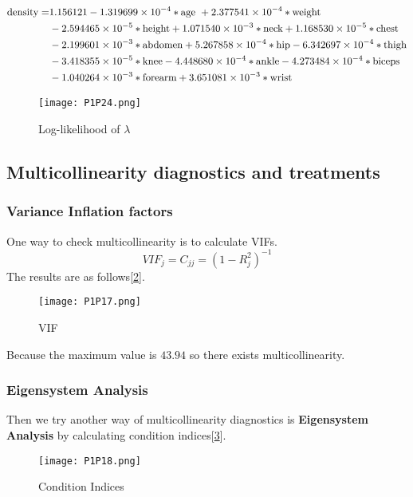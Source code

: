 \documentclass[11pt]{article}
\begin{document}
\begin{align}
	\text{density} = &1.156121-1.319699\times10^{-4} *\text{age }+2.377541\times10^{-4}*\text{weight}\notag\\
	&-2.594465\times10^{-5}*\text{height}+1.071540\times10^{-3}*\text{neck} +1.168530\times10^{-5}*\text{chest}\notag\\
	&-2.199601\times10^{-3}*\text{abdomen}+5.267858\times10^{-4}*\text{hip}-6.342697\times10^{-4}*\text{thigh}\notag \\ 
    &-3.418355\times10^{-5}*\text{knee} -4.448680\times10^{-4}*\text{ankle}-4.273484\times10^{-4}*\text{biceps}\notag\\
    & -1.040264\times10^{-3}*\text{forearm}+3.651081\times10^{-3}*\text{wrist}\label{eq2}    
\end{align}

\begin{figure}[!htb]
\centering
\texttt{[image: P1P24.png]}
\caption{Log-likelihood of $\lambda$}\label{Fig21}
\end{figure}


\subsection{Multicollinearity diagnostics and treatments}\label{ch5}

\subsubsection{Variance Inflation factors}


One way to check multicollinearity is to calculate VIFs.$$VIF_j=C_{jj}=(1-R_j^2)^{-1}$$The results are as follows[\ref{Fig14}].

\begin{figure}[!htb]
\centering
\texttt{[image: P1P17.png]}
\caption{VIF}\label{Fig14}
\end{figure}

Because the maximum value is $43.94$ so there exists multicollinearity.

\subsubsection{Eigensystem Analysis}

Then we try another way of multicollinearity diagnostics is {\bf Eigensystem Analysis} by calculating condition indices[\ref{Fig15}].

\begin{figure}[!htb]
\centering
\texttt{[image: P1P18.png]}
\caption{Condition Indices}\label{Fig15}
\end{figure}
\end{document}
